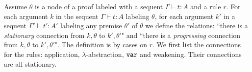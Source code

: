 %
%

%

Assume $\theta$ is a node of a proof labeled with a sequent $\Gamma \vdash t:A$
and a rule $r$. For each argument $k$ in the sequent $\Gamma \vdash t:A$ labeling
$\theta$, for each argument  $k'$ in a sequent $\Gamma' \vdash t':A'$ labeling
any premise $\theta'$ of $\theta$ we define
the relations: ``there is a \emph{stationary} connection from $k,\theta$ to $k',\theta'$"
and ``there is a \emph{progressing} connection from $k,\theta$ to $k',\theta'$". 
The definition is by cases on $r$.
We first list the connections for the rules: application, $\lambda$-abstraction, ${\tt var}$
and weakening. Their connections are all stationary.

